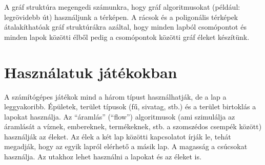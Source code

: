 \noindent A gráf struktúra megengedi számunkra, hogy gráf algoritmusokat (például: legrövidebb út) használjunk a térképen. A rácsok és a poligonális térképek átalakíthatóak gráf struktúrákra azáltal, hogy minden lapból csomópontot és minden lapok közötti élből pedig a csomópontok közötti gráf éleket készítünk.

\section*{Használatuk játékokban}

A számítógépes játékok mind a három típust használhatják, de a lap a leggyakoribb. Épületek, terület típusok (fű, sivatag, stb.) és a terület birtoklás a lapokat használja. Az “áramlás” (“flow”) algoritmusok (ami szimulálja az áramlását a víznek, embereknek, termékeknek, stb. a szomszédos csempék között) használják az éleket. Az élek a két lap közötti kapcsolatot írják le, tehát megadják, hogy az egyik lapról elérhető a másik lap. A magasság a csúcsokat használja. Az utakhoz lehet használni a lapokat és az éleket is.